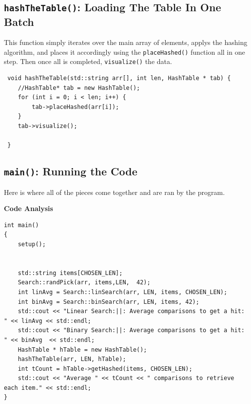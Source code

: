 \documentclass[letterpaper, 10pt]{article}
\begin{document}
\subsection{\texttt{hashTheTable()}: Loading The Table In One Batch}

This function simply iterates over the main array of elements, applys the hashing algorithm, and places it accordingly using the \texttt{placeHashed()} function all in one step. Then once all is completed, \texttt{visualize()} the data.

\begin{addmargin}[-5em]{1em}
\begin{small}
\begin{verbatim}
 void hashTheTable(std::string arr[], int len, HashTable * tab) { 
 	//HashTable* tab = new HashTable();
 	for (int i = 0; i < len; i++) {
 		tab->placeHashed(arr[i]);
 	}
 	tab->visualize();
	
 }
\end{verbatim}
\end{small}
\end{addmargin}

\subsection{\texttt{main()}: Running the Code}

Here is where all of the pieces come together and are ran by the program.
\begin{center}
    \textbf{Code Analysis}
\end{center}
\begin{addmargin}[-5em]{1em}
\begin{small}
\begin{verbatim}
int main()
{
	setup();


	std::string items[CHOSEN_LEN];
	Search::randPick(arr, items,LEN,  42);
	int linAvg = Search::linSearch(arr, LEN, items, CHOSEN_LEN);
	int binAvg = Search::binSearch(arr, LEN, items, 42);
	std::cout << "Linear Search:||: Average comparisons to get a hit: " << linAvg << std::endl;
	std::cout << "Binary Search:||: Average comparisons to get a hit: " << binAvg  << std::endl;
	HashTable * hTable = new HashTable();
	hashTheTable(arr, LEN, hTable);
	int tCount = hTable->getHashed(items, CHOSEN_LEN);
	std::cout << "Average " << tCount << " comparisons to retrieve each item." << std::endl; 
}

\end{verbatim}
\end{small}
\end{addmargin} 
\end{document}
